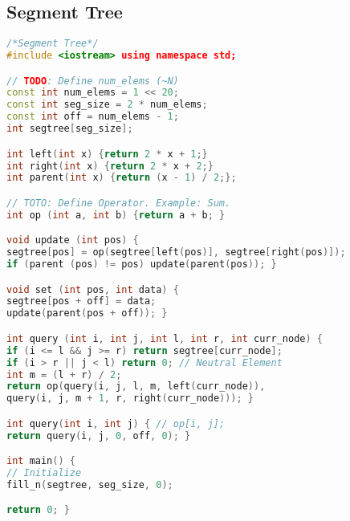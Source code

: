 \subsection{Segment Tree}
\begin{lstlisting}[language=C++]
/*Segment Tree*/
#include <iostream> using namespace std;

// TODO: Define num_elems (~N)
const int num_elems = 1 << 20;
const int seg_size = 2 * num_elems;
const int off = num_elems - 1;
int segtree[seg_size];

int left(int x) {return 2 * x + 1;}
int right(int x) {return 2 * x + 2;}
int parent(int x) {return (x - 1) / 2;};

// TOTO: Define Operator. Example: Sum.
int op (int a, int b) {return a + b; }

void update (int pos) {
segtree[pos] = op(segtree[left(pos)], segtree[right(pos)]);
if (parent (pos) != pos) update(parent(pos)); }

void set (int pos, int data) {
segtree[pos + off] = data;
update(parent(pos + off)); }

int query (int i, int j, int l, int r, int curr_node) {
if (i <= l && j >= r) return segtree[curr_node];
if (i > r || j < l) return 0; // Neutral Element
int m = (l + r) / 2;
return op(query(i, j, l, m, left(curr_node)),
query(i, j, m + 1, r, right(curr_node))); }

int query(int i, int j) { // op[i, j];
return query(i, j, 0, off, 0); }

int main() {
// Initialize
fill_n(segtree, seg_size, 0);

return 0; }
\end{lstlisting}